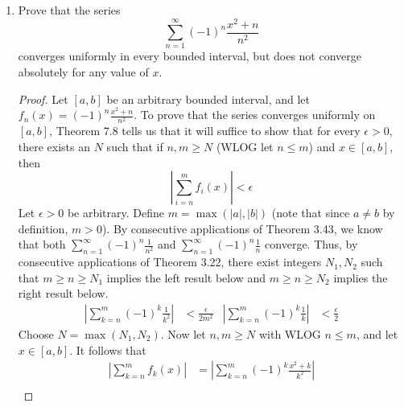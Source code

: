 \documentclass[../psets.tex]{subfiles}
\begin{document}
\begin{enumerate}[label={\textbf{\arabic*.}}]
\begin{proof}
        It follows by an argument symmetric to the above that while $\sum f_n$ converges absolutely to
        \begin{equation*}
            f(x) =
            \begin{cases}
                0 & x\leq 0\\
                \sin^2\frac{\pi}{x} & 0<x<1\\
                0 & x\geq 1
            \end{cases}
        \end{equation*}
        $M_n=1$ for all $n\in\N$.
    \end{proof}
    \item Prove that the series
    \begin{equation*}
        \sum_{n=1}^\infty(-1)^n\frac{x^2+n}{n^2}
    \end{equation*}
    converges uniformly in every bounded interval, but does not converge absolutely for any value of $x$.
    \begin{proof}
        Let $[a,b]$ be an arbitrary bounded interval, and let $f_n(x)=(-1)^n\tfrac{x^2+n}{n^2}$. To prove that the series converges uniformly on $[a,b]$, Theorem 7.8 tells us that it will suffice to show that for every $\epsilon>0$, there exists an $N$ such that if $n,m\geq N$ (WLOG let $n\leq m$) and $x\in[a,b]$, then
        \begin{equation*}
            \left| \sum_{i=n}^mf_i(x) \right| < \epsilon
        \end{equation*}
        Let $\epsilon>0$ be arbitrary. Define $m=\max(|a|,|b|)$ (note that since $a\neq b$ by definition, $m>0$). By consecutive applications of Theorem 3.43, we know that both $\sum_{n=1}^\infty(-1)^n\tfrac{1}{n^2}$ and $\sum_{n=1}^\infty(-1)^n\tfrac{1}{n}$ converge. Thus, by consecutive applications of Theorem 3.22, there exist integers $N_1,N_2$ such that $m\geq n\geq N_1$ implies the left result below and $m\geq n\geq N_2$ implies the right result below.
        \begin{align*}
            \left| \sum_{k=n}^m(-1)^k\frac{1}{k^2} \right| &< \frac{\epsilon}{2m^2}&
            \left| \sum_{k=n}^m(-1)^k\frac{1}{k} \right| &< \frac{\epsilon}{2}
        \end{align*}
        Choose $N=\max(N_1,N_2)$. Now let $n,m\geq N$ with WLOG $n\leq m$, and let $x\in[a,b]$. It follows that
        \begingroup
        \allowdisplaybreaks
        \begin{align*}
            \left| \sum_{k=n}^mf_k(x) \right| &= \left| \sum_{k=n}^m(-1)^k\frac{x^2+k}{k^2} \right|\\

\end{align*}
\end{proof}
\end{enumerate}
\end{document}
